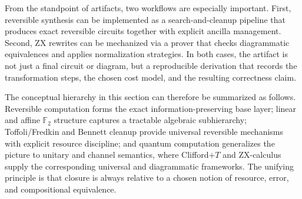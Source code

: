 \documentclass[11pt]{article}
\begin{document}
From the standpoint of artifacts, two workflows are especially important. First, reversible synthesis can be implemented as a search-and-cleanup pipeline that produces exact reversible circuits together with explicit ancilla management. Second, ZX rewrites can be mechanized via a prover that checks diagrammatic equivalences and applies normalization strategies. In both cases, the artifact is not just a final circuit or diagram, but a reproducible derivation that records the transformation steps, the chosen cost model, and the resulting correctness claim.

The conceptual hierarchy in this section can therefore be summarized as follows. Reversible computation forms the exact information-preserving base layer; linear and affine \(\mathbb{F}_2\) structure captures a tractable algebraic subhierarchy; Toffoli/Fredkin and Bennett cleanup provide universal reversible mechanisms with explicit resource discipline; and quantum computation generalizes the picture to unitary and channel semantics, where Clifford\(+T\) and ZX-calculus supply the corresponding universal and diagrammatic frameworks. The unifying principle is that closure is always relative to a chosen notion of resource, error, and compositional equivalence.
\end{document}
